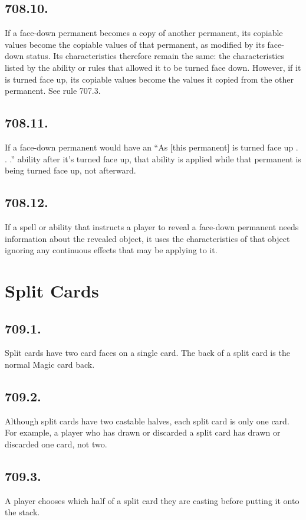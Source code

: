 \subsection*{708.10.}
If a face-down permanent becomes a copy of another permanent, its copiable values become the copiable values of that permanent, as modified by its face-down status. Its characteristics therefore remain the same: the characteristics listed by the ability or rules that allowed it to be turned face down. However, if it is turned face up, its copiable values become the values it copied from the other permanent. See rule 707.3.

\subsection*{708.11.}
If a face-down permanent would have an “As [this permanent] is turned face up . . .” ability after it’s turned face up, that ability is applied while that permanent is being turned face up, not afterward.

\subsection*{708.12.}
If a spell or ability that instructs a player to reveal a face-down permanent needs information about the revealed object, it uses the characteristics of that object ignoring any continuous effects that may be applying to it.

\section{Split Cards}
\subsection*{709.1.}
Split cards have two card faces on a single card. The back of a split card is the normal Magic card back.

\subsection*{709.2.}
Although split cards have two castable halves, each split card is only one card. For example, a player who has drawn or discarded a split card has drawn or discarded one card, not two.

\subsection*{709.3.}
A player chooses which half of a split card they are casting before putting it onto the stack.

